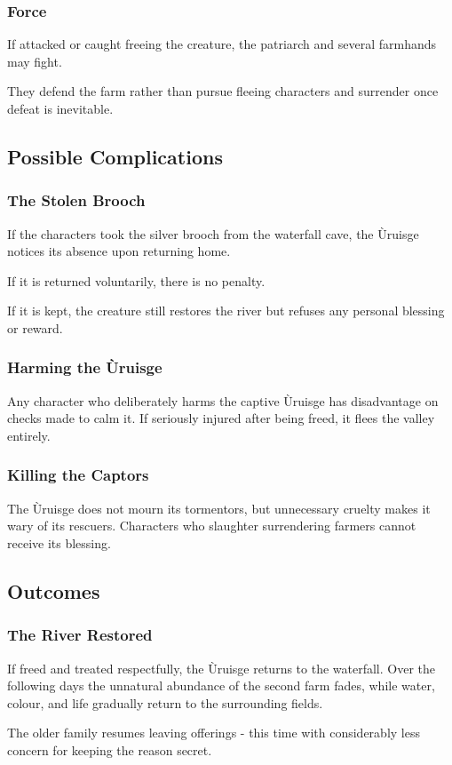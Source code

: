 \subsubsection*{Force}
{\entryfont If attacked or caught freeing the creature, the patriarch and several farmhands may fight.

They defend the farm rather than pursue fleeing characters and surrender once defeat is inevitable.}
\subsection*{Possible Complications}
\subsubsection*{The Stolen Brooch}
{\entryfont If the characters took the silver brooch from the waterfall cave, the Ùruisge notices its absence upon returning home.

If it is returned voluntarily, there is no penalty.

If it is kept, the creature still restores the river but refuses any personal blessing or reward.}
\subsubsection*{Harming the Ùruisge}
{\entryfont Any character who deliberately harms the captive Ùruisge has disadvantage on checks made to calm it. If seriously injured after being freed, it flees the valley entirely.}
\subsubsection*{Killing the Captors}
{\entryfont The Ùruisge does not mourn its tormentors, but unnecessary cruelty makes it wary of its rescuers. Characters who slaughter surrendering farmers cannot receive its blessing.}
\subsection*{Outcomes}
\subsubsection*{The River Restored}
{\entryfont If freed and treated respectfully, the Ùruisge returns to the waterfall. Over the following days the unnatural abundance of the second farm fades, while water, colour, and life gradually return to the surrounding fields.

The older family resumes leaving offerings - this time with considerably less concern for keeping the reason secret.}

